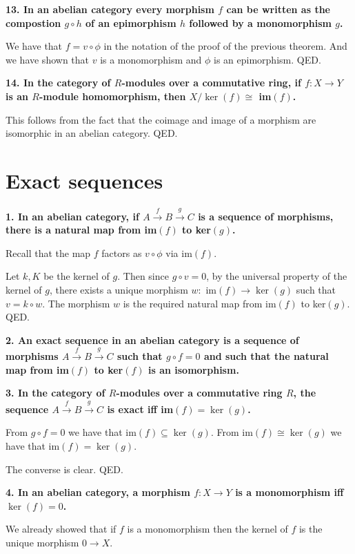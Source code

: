 \documentclass[12pt]{article}
\begin{document}
\textbf{13. In an abelian category every morphism $f$ can be written as the compostion $g\circ h$ of an epimorphism $h$ followed by a monomorphism $g$.}

We have that $f = v\circ \phi$ in the notation of the proof of the previous theorem. And we have shown that $v$ is a monomorphism and $\phi$ is an epimorphism. QED. 

\textbf{14. In the category of $R$-modules over a commutative ring, if $f : X \to Y$ is an $R$-module homomorphism, then $X/\ker(f) \cong$ im$(f)$.}

This follows from the fact that the coimage and image of a morphism are isomorphic in an abelian category. QED.

\section{Exact sequences}

\textbf{1. In an abelian category, if $A \overset{f}{\rightarrow} B \overset{g}{\rightarrow} C$ is a sequence of morphisms, there is a natural map from im$(f)$ to ker$(g)$.}

Recall that the map $f$ factors as $v\circ \phi$ via im$(f)$.

Let $k, K$ be the kernel of $g$. Then since $g\circ v = 0$, by the universal property of the kernel of $g$, there exists a unique morphism $w :$ im$(f) \to \ker(g)$ such that $v = k\circ w$. The morphism $w$ is the required natural map from im$(f)$ to ker$(g)$. QED.

\textbf{2. An exact sequence in an abelian category is a sequence of morphisms $A \overset{f}{\rightarrow} B \overset{g}{\rightarrow} C$ such that $g\circ f = 0$ and such that the natural map from im$(f)$ to ker$(f)$ is an isomorphism.}

\textbf{3. In the category of $R$-modules over a commutative ring $R$, the sequence $A \overset{f}{\rightarrow} B \overset{g}{\rightarrow} C$ is exact iff im$(f) = \ker(g)$.}

From $g\circ f = 0$ we have that im$(f) \subseteq \ker(g)$. From im$(f) \cong \ker(g)$ we have that im$(f) = \ker(g)$. 

The converse is clear. QED.

\textbf{4. In an abelian category, a morphism $f : X \to Y$ is a monomorphism iff $\ker(f) = 0$.}

We already showed that if $f$ is a monomorphism then the kernel of $f$ is the unique morphism $0 \to X$.
\end{document}
